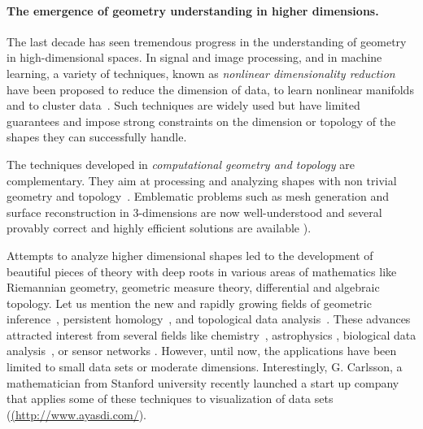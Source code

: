 \paragraph{The emergence of geometry understanding in higher dimensions.}
The last decade has seen tremendous progress in  the understanding of geometry in high-dimensional spaces. %
In signal and image processing, and in machine learning, a variety of techniques, known as {\em nonlinear dimensionality reduction} have been proposed to reduce the dimension of data, to learn nonlinear manifolds and to cluster data~\cite{lv-nldr-2007}. %
Such techniques are widely used but have limited guarantees and 
impose strong constraints on the dimension or topology of the shapes they can successfully handle. 

The techniques developed in {\em computational geometry and topology}  are complementary. They aim at processing and analyzing shapes with non trivial geometry and topology~\cite{hh-ct-2010}.
Emblematic problems such as mesh generation and surface reconstruction in 3-dimensions are now well-understood and several provably correct and highly efficient solutions are  available 
\cite{geometrica-ecg-book}).%

Attempts to analyze higher dimensional shapes led to the development of beautiful pieces of theory with deep roots in various areas of mathematics like Riemannian geometry, geometric measure theory, differential and algebraic topology. Let us mention the new and rapidly growing fields of geometric inference~\cite{ccsm-gipm-2011}, persistent homology~\cite{hh-ct-2010},  and topological data analysis~\cite{gc-td-2009}.  These advances attracted interest from several fields like   chemistry~\cite{mtcw-tco-2010}, astrophysics \cite{rvw-abu-2011}, biological data analysis~\cite{fpgo-airc-2009},  %
or sensor networks \cite{rg-bptd-2008}.
However, until now, the applications have been limited to small data sets or moderate dimensions.
Interestingly,  G. Carlsson, a mathematician from Stanford university recently launched
a start up company that applies some of these techniques to visualization of data sets
 (\url{(http://www.ayasdi.com/}{}).

